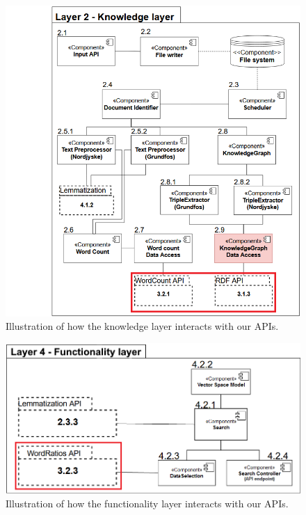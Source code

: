 \begin{figure}[h!]
    \centering
    \includegraphics[scale=0.5]{Images/PipeLineLayer2.png}
    \caption{Illustration of how the knowledge layer interacts with our APIs.}
    \label{PipelineLayer2}
\end{figure}

\begin{figure}[h!]
    \centering
    \includegraphics[scale=0.4]{Images/PipeLineLayer4SE.png}
    \caption{Illustration of how the functionality layer interacts with our APIs.}
    \label{PipelineLayer4}
\end{figure}

